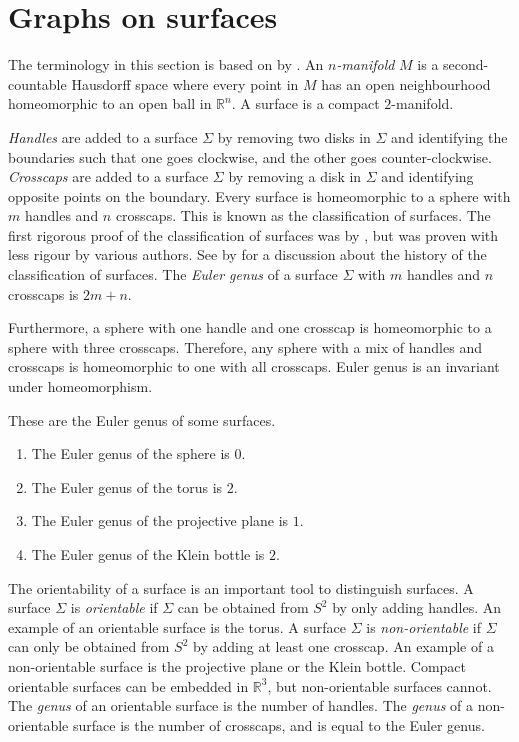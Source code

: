 \section{Graphs on surfaces}

The terminology in this section is based on  by \textcite{moharGraphsSurfaces2001}. An \textit{$n$-manifold} $M$ is a second-countable Hausdorff space where every point in $M$ has an open neighbourhood homeomorphic to an open ball in $\mathbb{R}^n$. A surface is a compact $2$-manifold. 

\textit{Handles} are added to a surface \(\Sigma\) by removing two disks in \(\Sigma\) and identifying the boundaries such that one goes clockwise, and the other goes counter-clockwise. \textit{Crosscaps} are added to a surface $\Sigma$ by removing a disk in \(\Sigma\) and identifying opposite points on the boundary. Every surface is homeomorphic to a sphere with $m$ handles and $n$ crosscaps. This is known as the classification of surfaces. The first rigorous proof of the classification of surfaces was by \textcite{brahanaSystemsCircuitsTwoDimensional1921}, but was proven with less rigour by various authors. See \cite{gallierClassificationTheoremCompact2013} by \citeauthor{gallierClassificationTheoremCompact2013} for a discussion about the history of the classification of surfaces. The \textit{Euler genus} of a surface \(\Sigma\) with $m$ handles and $n$ crosscaps is $2m + n$. 

Furthermore, a sphere with one handle and one crosscap is homeomorphic to a sphere with three crosscaps. Therefore, any sphere with a mix of handles and crosscaps is homeomorphic to one with all crosscaps. Euler genus is an invariant under homeomorphism. 

These are the Euler genus of some surfaces.
\begin{enumerate}
	\item The Euler genus of the sphere is \(0\).
	\item The Euler genus of the torus is \(2\).
	\item The Euler genus of the projective plane is \(1\). 
	\item The Euler genus of the Klein bottle is \(2\). 
\end{enumerate}

The orientability of a surface is an important tool to distinguish surfaces. A surface \(\Sigma\) is \textit{orientable} if \(\Sigma\) can be obtained from \(S^2\) by only adding handles. An example of an orientable surface is the torus. A surface \(\Sigma\) is \textit{non-orientable} if \(\Sigma\) can only be obtained from \(S^2\) by adding at least one crosscap. An example of a non-orientable surface is the projective plane or the Klein bottle. Compact orientable surfaces can be embedded in $\mathbb{R}^3$, but non-orientable surfaces cannot. The \textit{genus} of an orientable surface is the number of handles. The \textit{genus} of a non-orientable surface is the number of crosscaps, and is equal to the Euler genus. 

